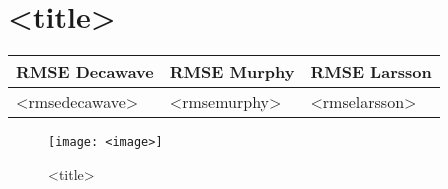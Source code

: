 \section*{<title>}

\begin{table}[H]
\begin{tabular}{@{}lll@{}}
\toprule
    RMSE Decawave & RMSE Murphy & RMSE Larsson  \\ \midrule
    <rmsedecawave> & <rmsemurphy> & <rmselarsson> \\ \bottomrule
\end{tabular}
\end{table}

\begin{figure}[tph]
    \centering
    \texttt{[image: <image>]}
    \caption{<title>}
	\label{fig:m1}
\end{figure}

\clearpage